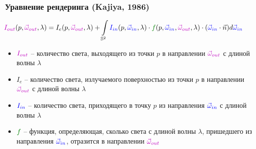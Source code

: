 \documentclass[10pt]{beamer}
\begin{document}
\begin{frame}[fragile]
\frametitle{Уравнение рендеринга (Kajiya, 1986)}
\begin{equation*}
\hspace*{-0.5cm}
{\color{magenta}I_{out}}(p, {\color{magenta}\vec\omega_{out}}, \lambda) = I_{e}(p, {\color{magenta}\vec\omega_{out}}, \lambda)+\int\limits_{\mathbb S^2} {\color{blue}I_{in}}(p, {\color{blue}\vec\omega_{in}}, \lambda) \cdot {\color{green}f}(p, {\color{blue}\vec\omega_{in}}, {\color{magenta}\vec\omega_{out}}, \lambda) \cdot ({\color{blue}\vec\omega_{in}} \cdot \vec{n}) d{\color{blue}\vec\omega_{in}}
\end{equation*}
\hspace*{-0.5cm}
\pause
\begin{itemize}
\item \begin{math}{\color{magenta}I_{out}}\end{math} -- количество света, выходящего из точки \begin{math}p\end{math} в направлении \begin{math}{\color{magenta}\vec\omega_{out}}\end{math} с длиной волны \begin{math}\lambda\end{math}
\pause
\item \begin{math}I_{e}\end{math} -- количество света, излучаемого поверхностью из точки \begin{math}p\end{math} в направлении \begin{math}{\color{magenta}\vec\omega_{out}}\end{math} с длиной волны \begin{math}\lambda\end{math}
\pause
\item \begin{math}{\color{blue}I_{in}}\end{math} -- количество света, приходящего в точку \begin{math}p\end{math} из направления \begin{math}{\color{blue}\vec\omega_{in}}\end{math} с длиной волны \begin{math}\lambda\end{math}
\pause
\item \begin{math}{\color{green}f}\end{math} -- функция, определяющая, сколько света с длиной волны \begin{math}\lambda\end{math}, пришедшего из направления \begin{math}{\color{blue}\vec\omega_{in}}\end{math}, отразится в направлении \begin{math}{\color{magenta}\vec\omega_{out}}\end{math}

\end{itemize}
\end{frame}
\end{document}
